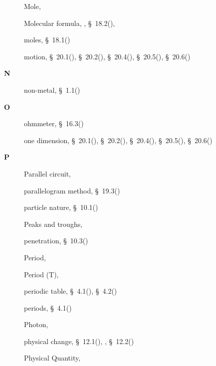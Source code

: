 \begin{multicols}{2}
{\begin{description}
	  \item[] \noindent\raggedright Mole,  \pageref{id2496528}
	  \item[] \noindent\raggedright Molecular formula,  \pageref{id2456697},  \S~18.2(\pageref{m38712}),  \pageref{id2501878}
	  \item[] \noindent\raggedright moles,  \S~18.1(\pageref{m38717})
	  \item[] \noindent\raggedright motion,  \S~20.1(\pageref{m38787}),  \S~20.2(\pageref{m38788}),  \S~20.4(\pageref{m38794}),  \S~20.5(\pageref{m38795}),  \S~20.6(\pageref{m38796})
	  \vspace{.3cm}
	  \item[{\large \bfseries N}]\noindent\raggedright
	  non-metal,  \S~1.1(\pageref{m38708})
	  \vspace{.3cm}
	  \item[{\large \bfseries O}]\noindent\raggedright
	  ohmmeter,  \S~16.3(\pageref{m38773})
	  \item[] \noindent\raggedright one dimension,  \S~20.1(\pageref{m38787}),  \S~20.2(\pageref{m38788}),  \S~20.4(\pageref{m38794}),  \S~20.5(\pageref{m38795}),  \S~20.6(\pageref{m38796})
	  \vspace{.3cm}
	  \item[{\large \bfseries P}]\noindent\raggedright
	  Parallel circuit,  \pageref{id2478767}
	  \item[] \noindent\raggedright parallelogram method,  \S~19.3(\pageref{m38815})
	  \item[] \noindent\raggedright particle nature,  \S~10.1(\pageref{m38777})
	  \item[] \noindent\raggedright Peaks and troughs,  \pageref{id2439255}
	  \item[] \noindent\raggedright penetration,  \S~10.3(\pageref{m38779})
	  \item[] \noindent\raggedright Period,  \pageref{id2445953}
	  \item[] \noindent\raggedright Period (T),  \pageref{id2440606}
	  \item[] \noindent\raggedright periodic table,  \S~4.1(\pageref{m38760}),  \S~4.2(\pageref{m38757})
	  \item[] \noindent\raggedright periods,  \S~4.1(\pageref{m38760})
	  \item[] \noindent\raggedright Photon,  \pageref{id2452276}
	  \item[] \noindent\raggedright physical change,  \S~12.1(\pageref{m38709}),  \pageref{id2458225},  \S~12.2(\pageref{m38711})
	  \item[] \noindent\raggedright Physical Quantity,  \pageref{id2399394}

\end{description}}
\end{multicols}
